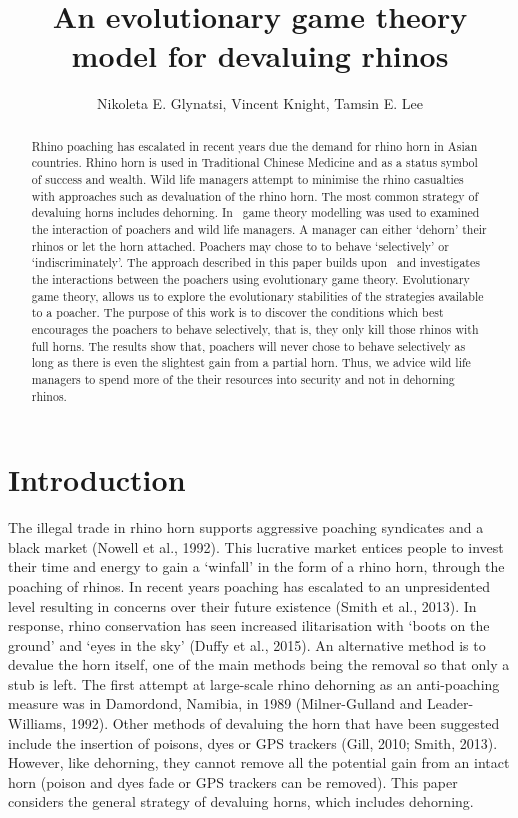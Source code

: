 \documentclass[10pt]{article}
\title{An evolutionary game theory model for devaluing rhinos}
\author{Nikoleta E. Glynatsi, Vincent Knight, Tamsin E. Lee} %
\date{}
\begin{document}

\maketitle

\begin{abstract}

Rhino poaching has escalated in recent years due the demand for rhino horn in 
Asian countries. Rhino horn is used in Traditional Chinese Medicine and as a 
status symbol of success and wealth. Wild life managers attempt to minimise
the rhino casualties with approaches such as devaluation of the rhino horn. 
The  most common strategy of devaluing horns includes dehorning. In~\cite{Lee}
game theory modelling was used to examined the interaction of poachers and
wild life managers.  A manager can either `dehorn' their rhinos or let the
horn attached. Poachers may chose to to behave `selectively' or `indiscriminately'.
The approach described in this paper builds upon~\cite{Lee} and investigates 
the interactions  between the poachers using evolutionary game theory. 
Evolutionary game theory, allows us to explore the evolutionary stabilities 
of the strategies available to a poacher. The purpose of this work is to discover
the conditions which best  encourages the poachers to behave selectively, that
is, they only kill those rhinos with full horns.  The results show that, poachers
will never chose to behave selectively as long as there is even the slightest
gain from a partial horn. Thus, we advice wild life managers to spend more of
 the their resources into security and not in dehorning rhinos.
\end{abstract}

\section{Introduction}\label{section:introduction}

The illegal trade in rhino horn supports aggressive poaching syndicates and a 
black market (Nowell et al., 1992). This lucrative market entices people to invest
their time and energy to gain a `winfall' in the form of a rhino horn, through the 
poaching of rhinos. In recent years poaching has escalated to an unpresidented 
level resulting in concerns over their future existence (Smith et al., 2013). In 
response, rhino conservation has seen increased  ilitarisation with `boots on the 
ground' and `eyes in the sky' (Duffy et al., 2015). An alternative method is to 
devalue the horn itself, one of the main  methods being the removal so that only
a stub is left. The first attempt at large-scale rhino dehorning as an anti-poaching
measure was in Damordond,  Namibia, in 1989 (Milner-Gulland and Leader-Williams,
1992). Other methods of devaluing the horn that have been suggested include
the insertion of poisons, dyes or GPS trackers (Gill, 2010; Smith, 2013). However, 
like dehorning, they cannot remove all the potential gain from an intact horn 
(poison and dyes fade or GPS trackers can be removed). This paper considers 
the general strategy of devaluing horns, which includes dehorning.
\end{document}
